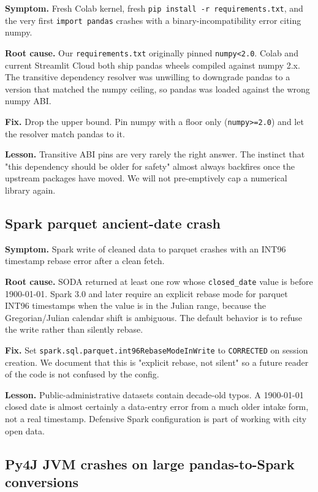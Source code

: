 \documentclass[11pt,letterpaper]{article}
\begin{document}
\textbf{Symptom.} Fresh Colab kernel, fresh \texttt{pip install -r requirements.txt}, and the very first \texttt{import pandas} crashes with a binary-incompatibility error citing numpy.

\textbf{Root cause.} Our \texttt{requirements.txt} originally pinned \texttt{numpy<2.0}. Colab and current Streamlit Cloud both ship pandas wheels compiled against numpy 2.x. The transitive dependency resolver was unwilling to downgrade pandas to a version that matched the numpy ceiling, so pandas was loaded against the wrong numpy ABI.

\textbf{Fix.} Drop the upper bound. Pin numpy with a floor only (\texttt{numpy>=2.0}) and let the resolver match pandas to it.

\textbf{Lesson.} Transitive ABI pins are very rarely the right answer. The instinct that "this dependency should be older for safety" almost always backfires once the upstream packages have moved. We will not pre-emptively cap a numerical library again.

\subsection{Spark parquet ancient-date crash}

\textbf{Symptom.} Spark write of cleaned data to parquet crashes with an INT96 timestamp rebase error after a clean fetch.

\textbf{Root cause.} SODA returned at least one row whose \texttt{closed\_date} value is before 1900-01-01. Spark 3.0 and later require an explicit rebase mode for parquet INT96 timestamps when the value is in the Julian range, because the Gregorian/Julian calendar shift is ambiguous. The default behavior is to refuse the write rather than silently rebase.

\textbf{Fix.} Set \texttt{spark.sql.parquet.int96Re\-base\-Mode\-In\-Write} to \texttt{CORRECTED} on session creation. We document that this is "explicit rebase, not silent" so a future reader of the code is not confused by the config.

\textbf{Lesson.} Public-administrative datasets contain decade-old typos. A 1900-01-01 closed date is almost certainly a data-entry error from a much older intake form, not a real timestamp. Defensive Spark configuration is part of working with city open data.

\subsection{Py4J JVM crashes on large pandas-to-Spark conversions}
\end{document}
